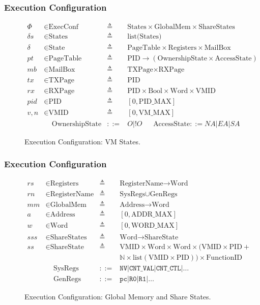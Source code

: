 \documentclass{beamer}
\newcommand*{\defined}{\triangleq}
\newcommand*{\maps}{\rightarrow}
\newcommand*{\derived}{::=}
\newcommand*{\CONF}{\text{ExecConf}}
\newcommand*{\STATE}{\text{State}}
\newcommand*{\MEM}{\text{GlobalMem}}
\newcommand*{\SSS}{\text{ShareStates}}
\newcommand*{\PID}{\text{PID}}
\newcommand*{\PT}{\text{PageTable}}
\newcommand*{\AS}{\text{AccessState}}
\newcommand*{\OS}{\text{OwnershipState}}
\newcommand*{\REGS}{\text{Registers}}
\newcommand*{\ADDR}{\text{Address}}
\newcommand*{\WORD}{\text{Word}}
\newcommand*{\VMID}{\text{VMID}}
\newcommand*{\REGNAMES}{\text{RegisterName}}
\newcommand*{\MB}{\text{MailBox}}
\newcommand*{\PAMAX}{\text{ADDR\_MAX}}
\newcommand*{\PPIDMAX}{\text{PID\_MAX}}
\newcommand*{\PWMAX}{\text{WORD\_MAX}}
\newcommand*{\PVMMAX}{\text{VM\_MAX}}
\begin{document}
\begin{frame}
  \frametitle{Execution Configuration}
\begin{figure}
  \begin{align*}
    \Phi &\in \CONF &\defined &\text{States} \times \MEM \times \SSS \\
    \delta s &\in \text{States} &\defined &\text{list(States)} \\
    \delta &\in \STATE &\defined &\PT \times \REGS \times \MB \\
    pt & \in \PT & \defined & \PID \maps (\OS \times \AS) \\
    mb & \in \MB &\defined &\text{TXPage} \times  \text{RXPage}\\
    tx & \in \text{TXPage} &\defined &\PID\\
    rx & \in \text{RXPage} &\defined &\PID \times \text{Bool} \times \WORD \times \VMID \\
    pid & \in \PID &\defined  &[ 0, \PPIDMAX ] \\
     v,n & \in \VMID &\defined  &[ 0, \PVMMAX ] \\
      & \;\;\;\; \OS & \derived & O | !O  ~~~~~~~  \AS  \derived  NA | EA | SA
  \end{align*}
  \caption{Execution Configuration: VM States.}
\end{figure}

\end{frame}

\begin{frame}
  \frametitle{Execution Configuration}
\begin{figure}
  \begin{align*}
      rs & \in \REGS &\defined  &\REGNAMES \maps \WORD \\
    rn & \in \REGNAMES &\defined &\text{SysRegs} \cup \text{GenRegs}\\
    mm & \in \MEM &\defined  &\ADDR \maps \WORD \\
    a & \in \ADDR &\defined  &[ 0, \PAMAX ] \\
    w & \in \WORD &\defined  &[ 0, \PWMAX ] \\
    sss & \in \SSS &\defined  &\WORD \maps \text{ShareState} \\
    ss & \in \text{ShareState} &\defined &\VMID \times \WORD \times \WORD \times (\VMID \times \PID +\\
                                           &&&\mathbb{N} \times \text{list}(\VMID \times \PID)) \times \text{FunctionID}\\
      & \;\;\;\; \text{SysRegs} &\derived & \mathtt{NV} | \mathtt{CNT\_VAL} | \mathtt{CNT\_CTL} | \dots \\
         & \;\;\;\; \text{GenRegs} &\derived & \mathtt{pc} | \mathtt {R0} | \mathtt{R1} | \dots
  \end{align*}
  \caption{Execution Configuration: Global Memory and Share States.}
\end{figure}

\end{frame}
\end{document}
